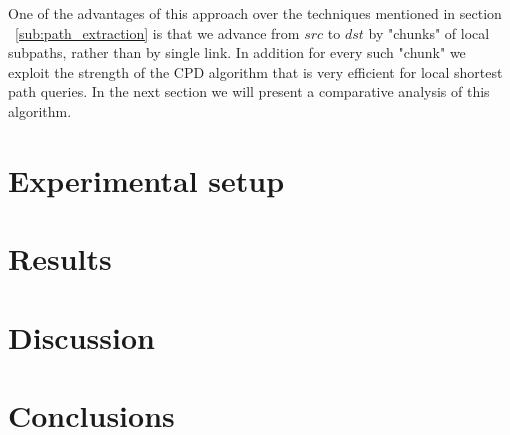 \documentclass[runningheads,a4paper]{llncs}
\begin{document}
One of the advantages of this approach over the techniques mentioned in section ~\ref{sub:path_extraction} is that we advance from $src$ to $dst$ by "chunks"
of local subpaths, rather than by single link. In addition for every such "chunk" we exploit the strength of the CPD algorithm that is
very efficient for local shortest path queries. In the next section we will present a comparative analysis of this algorithm.

\section{Experimental setup}

\section{Results}

\section{Discussion}

\section{Conclusions}




\end{document}
